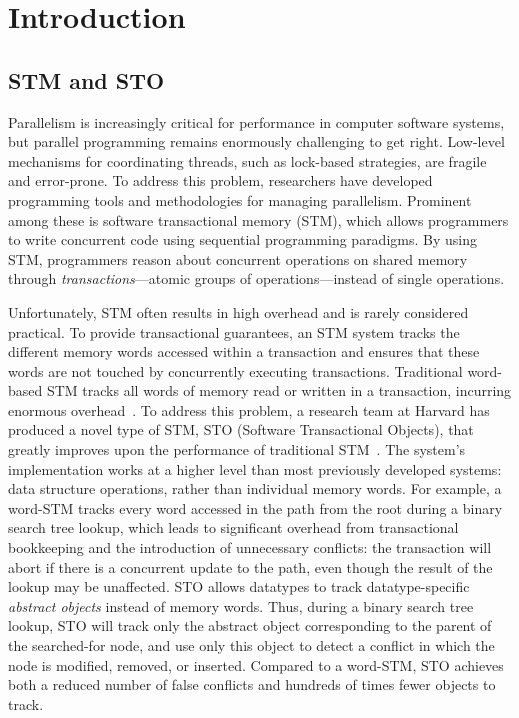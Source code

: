 \chapter{Introduction}
\section{STM and STO}
Parallelism is increasingly critical for performance in computer software systems, but parallel programming remains enormously challenging to get right. Low-level mechanisms for coordinating threads, such as lock-based strategies, are fragile and error-prone. To address this problem, researchers have developed programming tools and methodologies for managing parallelism. Prominent among these is software transactional memory (STM), which allows programmers to write concurrent code using sequential programming paradigms. By using STM, programmers reason about concurrent operations on shared memory through \emph{transactions}---atomic groups of operations---instead of single operations. 

Unfortunately, STM often results in high overhead and is rarely considered practical. To provide transactional guarantees, an STM system tracks the different memory words accessed within a transaction and ensures that these words are not touched by concurrently executing transactions. Traditional word-based STM tracks all words of memory read or written in a transaction, incurring enormous overhead~\cite{cascaval}. To address this problem, a research team at Harvard has produced a novel type of STM, STO (Software Transactional Objects), that greatly improves upon the performance of traditional STM~\cite{sto}. The system's implementation works at a higher level than most previously developed systems: data structure operations, rather than individual memory words. For example, a word-STM tracks every word accessed in the path from the root during a binary search tree lookup, which leads to significant overhead from transactional bookkeeping and the introduction of unnecessary conflicts: the transaction will abort if there is a concurrent update to the path, even though the result of the lookup may be unaffected. STO allows datatypes to track datatype-specific \emph{abstract objects} instead of memory words. Thus, during a binary search tree lookup, STO will track only the abstract object corresponding to the parent of the searched-for node, and use only this object to detect a conflict in which the node is modified, removed, or inserted. Compared to a word-STM, STO achieves both a reduced number of false conflicts and hundreds of times fewer objects to track.


